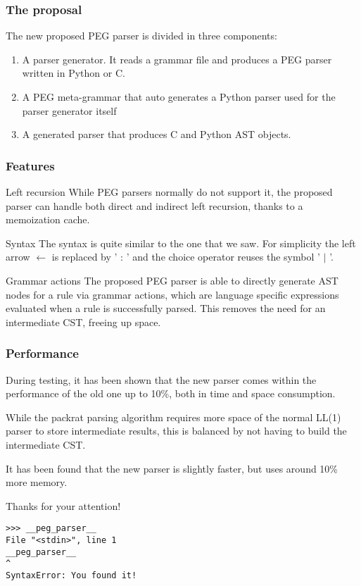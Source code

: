 \begin{frame}
	\frametitle{The proposal}
	The new proposed PEG parser is divided in three components:\begin{enumerate}
		\item A parser generator. It reads  a grammar file and produces a PEG parser written in Python or C.
		
		\item A PEG meta-grammar that auto generates a Python parser used for the parser generator itself
		\item A generated parser that produces C and Python AST objects.
	\end{enumerate} 
\end{frame}
\begin{frame}
	\frametitle{Features}
	
	\begin{block}{Left recursion}
		While PEG parsers normally do not support it, the proposed parser can handle both direct and indirect left recursion, thanks to a memoization cache.
	\end{block}

	\begin{block}{Syntax}
		The syntax is quite similar to the one that we saw. For simplicity the left arrow $\leftarrow$ is replaced by ' : ' and the choice operator reuses the symbol ' $|$ '.
	\end{block}

	\begin{block}{Grammar actions}
		The proposed PEG parser is able to directly generate AST nodes  for a rule via grammar actions, which are language specific expressions evaluated when a rule is successfully parsed. This removes the need for an intermediate CST, freeing up space.
	\end{block}


\end{frame}
\begin{frame}
\frametitle{Performance}

During testing, it has been shown that the new parser comes within the performance of the old one up to 10\%, both in time and space consumption.

While the packrat parsing algorithm requires more space of the normal LL(1) parser to store intermediate results, this is balanced by not having to build the intermediate CST.

It has been found that the new parser is slightly faster, but uses around 10\% more memory. 
\end{frame}

\begin{frame}[fragile]
	\huge
	
	Thanks for your attention!
	
	\large 
	\begin{verbatim}
>>> __peg_parser__
File "<stdin>", line 1
__peg_parser__
^
SyntaxError: You found it!
\end{verbatim}

\end{frame}